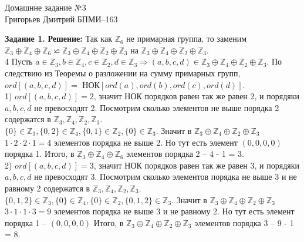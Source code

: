 \documentclass[12pt,a4paper]{scrartcl}
\begin{document}
	\begin{center}	
		Домашнне задание №3 \\
		Григорьев Дмитрий БПМИ--163
	\end{center}
	\textbf{Задание 1.}
	\newline
	\textbf{Решение:}
	\newline
	\indent
		Так как $\mathbb{Z}_6$ не примарная группа, то заменим $\mathbb{Z}_3 \oplus \mathbb{Z}_4 \oplus \mathbb{Z}_6 \backsimeq \mathbb{Z}_3 \oplus \mathbb{Z}_4 \oplus \mathbb{Z}_2 \oplus \mathbb{Z}_3$ на $\mathbb{Z}_3 \oplus \mathbb{Z}_4 \oplus \mathbb{Z}_2 \oplus \mathbb{Z}_3$. \\4
		Пусть $a \in \mathbb{Z}_3, b \in \mathbb{Z}_4, c \in \mathbb{Z}_2, d  \in \mathbb{Z}_3 \Rightarrow (a, b, c, d) \in \mathbb{Z}_3 \oplus \mathbb{Z}_4 \oplus \mathbb{Z}_2 \oplus \mathbb{Z}_3$. По следствию из Теоремы о разложении на сумму примарных групп, $ord[(a, b, c, d)] =$  НОК$[ord(a), ord(b), ord(c), ord(d)]$. \\
		
		1) $ord[(a, b, c, d)] = 2$, значит НОК порядков равен так же равен 2, и порядяки $a, b, c, d$ не превосходят 2. Посмотрим сколько элементов не выше порядка 2 содержатся в $\mathbb{Z}_3, \mathbb{Z}_4, \mathbb{Z}_2, \mathbb{Z}_3$. \\
		$\{0\} \in \mathbb{Z}_3, \{0, 2\} \in \mathbb{Z}_4, \{0, 1\} \in \mathbb{Z}_2, \{0\} \in \mathbb{Z}_3$. Значит в $\mathbb{Z}_3 \oplus \mathbb{Z}_4 \oplus \mathbb{Z}_2 \oplus \mathbb{Z}_3$ $1 \cdot 2 \cdot 2 \cdot 1 = 4$ элементов порядка не выше 2. Но тут есть элемент $(0, 0, 0, 0)$ порядка 1. Итого, в $\mathbb{Z}_3 \oplus \mathbb{Z}_4 \oplus \mathbb{Z}_6$ элементов порядка 2 -- 4 - 1 = 3.\\
		
		2) $ord[(a, b, c, d)] = 3$, значит НОК порядков равен так же равен 3, и порядяки $a, b, c, d$ не превосходят 3. Посмотрим сколько элементов порядка не выше 3 и не равному 2 содержатся в $\mathbb{Z}_3, \mathbb{Z}_4, \mathbb{Z}_2, \mathbb{Z}_3$. \\
		$\{0, 1, 2\} \in \mathbb{Z}_3, \{0\} \in \mathbb{Z}_4, \{0\} \in \mathbb{Z}_2, \{0, 1, 2\} \in \mathbb{Z}_3$. Значит в $\mathbb{Z}_3 \oplus \mathbb{Z}_4 \oplus \mathbb{Z}_2 \oplus \mathbb{Z}_3$ $3 \cdot 1 \cdot 1 \cdot 3 = 9$ элементов порядка не выше 3 и не равному 2. Но тут есть элемент порядка 1 -- $(0, 0, 0, 0)$ Итого, в $\mathbb{Z}_3 \oplus \mathbb{Z}_4 \oplus \mathbb{Z}_2 \oplus \mathbb{Z}_3$ элементов порядка 3 -- 9 - 1 = 8.\\
		
\end{document}
